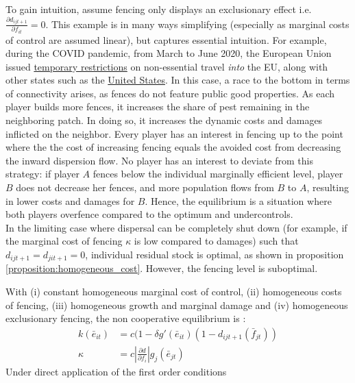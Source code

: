 To gain intuition, assume fencing only displays an exclusionary effect i.e. $\frac{\partial d_{ijt+1}}{\partial f_{it}}=0$. This example is in many ways simplifying (especially as marginal costs of control are assumed linear), but captures essential intuition. For example, during the COVID pandemic, from March to June 2020, the European Union issued \href{https://www.consilium.europa.eu/media/47592/st_9208_2020_init_en.pdf}{temporary restrictions} on non-essential travel \textit{into} the EU, along with other states such as the \href{https://www.dhs.gov/archive/news/2020/10/19/fact-sheet-dhs-measures-border-limit-further-spread-coronavirus}{United States}.
In this case, a race to the bottom in terms of connectivity arises, as fences do not feature public good properties. As each player builds more fences, it increases the share of pest remaining in the neighboring patch. In doing so, it increases the dynamic costs and damages inflicted on the neighbor. Every player has an interest in fencing up to the point where the the cost of increasing fencing equals the avoided cost from decreasing the inward dispersion flow. No player has an interest to deviate from this strategy: if player $A$ fences below the individual marginally efficient level, player $B$ does not decrease her fences, and more population flows from $B$ to $A$, resulting in lower costs and damages for $B$. Hence, the equilibrium is a situation where both players overfence compared to the optimum  and undercontrols. \\
In the limiting case where dispersal can be completely shut down (for example, if the marginal cost of fencing $\kappa$ is low compared to damages) such that $d_{ijt+1} = d_{jit+1} = 0$, individual residual stock is optimal, as shown in proposition \ref{proposition:homogeneous_cost}. However, the fencing level is suboptimal. 

\begin{proposition}
With (i) constant homogeneous marginal cost of control, (ii) homogeneous costs of fencing, (iii) homogeneous growth and marginal damage and (iv) homogeneous exclusionary fencing, the non cooperative equilibrium is : 
\begin{align}
k(\bar{e}_{it}) &= c(1 - \delta g'(\bar{e}_{it})(1 - d_{ijt+1}(\bar{f}_{jt}))\\
\kappa & = c \left|\frac{\partial d}{\partial f_i}\right| g_j(\bar{e}_{jt})
\end{align}
Under direct application of the first order conditions
\end{proposition}


